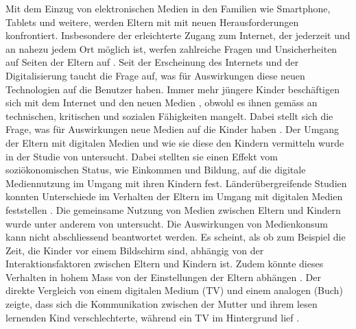 Mit dem Einzug von elektronischen Medien in den Familien wie Smartphone, Tablets und weitere, werden Eltern mit mit neuen Herausforderungen konfrontiert. Insbesondere der erleichterte Zugang zum Internet, der jederzeit und an nahezu jedem Ort möglich ist, werfen zahlreiche Fragen und Unsicherheiten auf Seiten der Eltern auf \cite{Wagner2016}. Seit der Erscheinung des Internets und der Digitalisierung taucht die Frage auf, was für Auswirkungen diese neuen Technologien auf die Benutzer haben. Immer mehr jüngere Kinder beschäftigen sich mit dem Internet und den neuen Medien \cite{Rideout2013a, Chaudron2015}, obwohl es ihnen gemäss  an technischen, kritischen und sozialen Fähigkeiten mangelt. Dabei stellt sich die Frage, was für Auswirkungen neue Medien auf die Kinder haben \cite{Tomopoulos2010, Pempek2014, Livingstone2015, Masur2015, Troseth2016}. Der Umgang der Eltern mit digitalen Medien und wie sie diese den Kindern vermitteln wurde in der Studie von  untersucht. Dabei stellten sie einen Effekt vom soziökonomischen Status, wie Einkommen und Bildung, auf die digitale Mediennutzung im Umgang mit ihren Kindern fest. Länderübergreifende Studien konnten Unterschiede im Verhalten der Eltern im Umgang mit digitalen Medien feststellen \cite{Helsper2013}. Die gemeinsame Nutzung von Medien zwischen Eltern und Kindern wurde unter anderem von  untersucht. Die Auswirkungen von Medienkonsum kann nicht abschliessend beantwortet werden. Es scheint, als ob zum Beispiel die Zeit, die Kinder vor einem Bildschirm sind, abhängig von der Interaktionsfaktoren zwischen Eltern und Kindern ist. Zudem könnte dieses Verhalten in hohem Mass von der Einstellungen der Eltern abhängen \cite{Lauricella2015}. Der direkte Vergleich von einem digitalen Medium (TV) und einem analogen (Buch) zeigte, dass sich die Kommunikation zwischen der Mutter und ihrem lesen lernenden Kind verschlechterte, während ein TV im Hintergrund lief \cite{Nathanson2011}.

